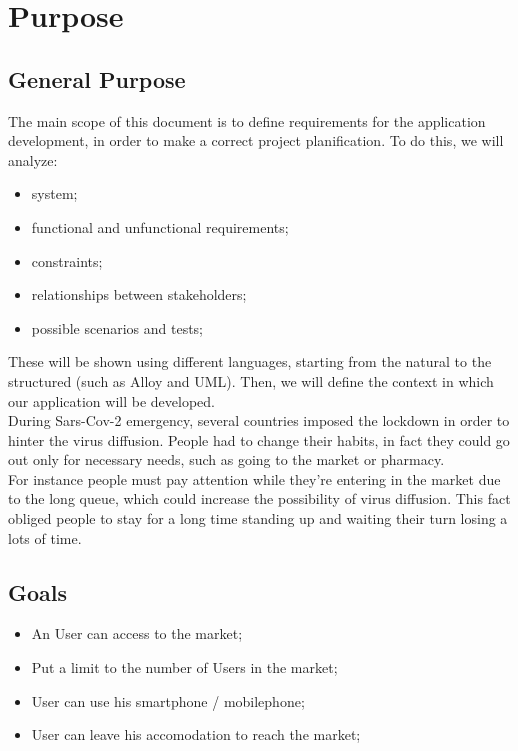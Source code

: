 \section{Purpose}
\subsection{General Purpose}

The main scope of this document is to define requirements for the application development, in order to make a correct project planification. 
To do this, we will analyze:

\begin{itemize}
\item system;
\item functional and unfunctional requirements;
\item constraints;
\item relationships between stakeholders;
\item possible scenarios and tests;
\end{itemize}
\bigskip
These will be shown using different languages, starting from the natural to the structured (such as Alloy and UML).
Then, we will define the context in which our application will be developed.\\
During Sars-Cov-2 emergency, several countries imposed the lockdown in order to hinter the virus diffusion.
People had to change their habits, in fact they could go out only for necessary needs, such as going to the market or pharmacy.\\
For instance people must pay attention while they're entering in the market due to the long queue, which could increase the possibility of virus diffusion.
This fact obliged people to stay for a long time standing up and waiting their turn losing a lots of time. 
\pagebreak

\subsection{Goals}


\begin{itemize}
    \item An User can access to the market;
    \item Put a limit to the number of Users in the market;
    \item User can use his smartphone / mobilephone;
    \item User can leave his accomodation to reach the market;
\end{itemize}

